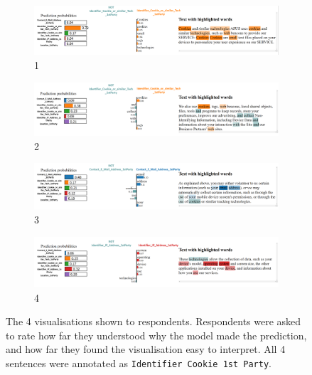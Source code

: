 \begin{figure}[!ht]
  \begin{subfigure}[b]{1\textwidth}
    \centering
    \includegraphics[width=1\linewidth]{figures/explanations_visualisations/section_4a/Picture1.png}
    \caption{1}
  \end{subfigure}
  \hfill
  \begin{subfigure}[b]{1\textwidth}
    \centering
    \includegraphics[width=1\linewidth]{figures/explanations_visualisations/section_4a/Picture2.png}
    \caption{2}
  \end{subfigure}
  \hfill
  \begin{subfigure}[b]{1\textwidth}
    \centering
    \includegraphics[width=1\linewidth]{figures/explanations_visualisations/section_4a/Picture3.png}
    \caption{3}
  \end{subfigure}
  \hfill
  \begin{subfigure}[b]{1\textwidth}
    \centering
    \includegraphics[width=1\linewidth]{figures/explanations_visualisations/section_4a/Picture4.png}
    \caption{4}
  \end{subfigure}
  \caption{The 4 visualisations shown to respondents. Respondents were asked to rate how far they understood why the model made the prediction, and how far they found the visualisation easy to interpret. All 4 sentences were annotated as \texttt{Identifier Cookie 1st Party}.}
  \label{fig:part4_explanations}
\end{figure}


